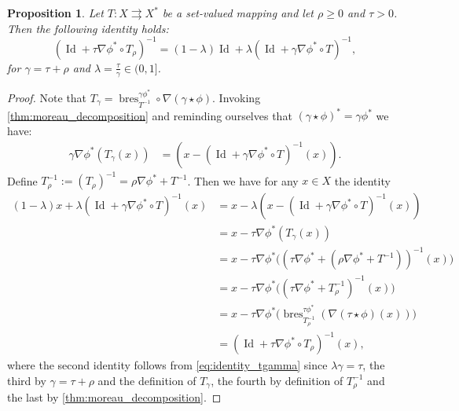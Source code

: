\documentclass[10pt,a4paper]{amsart}
\newtheorem{proposition}{Proposition}
\newcommand{\bres}[2]{\operatorname{bres}_{#2}^{#1}}
\DeclareMathOperator{\id}{Id}
\begin{document}
\begin{proposition} \label{thm:absorb_relaxation_stepsize}
    Let $T: X \rightrightarrows X^*$ be a set-valued mapping and let $\rho \geq 0$ and $\tau >0$. Then the following identity holds:
    \begin{equation}
    (\id + \tau \nabla \phi^* \circ T_\rho)^{-1} = (1 - \lambda) \id + \lambda(\id + \gamma\nabla \phi^* \circ T)^{-1},
    \end{equation}
    for $\gamma = \tau + \rho$ and $\lambda = \tfrac{\tau}{\gamma} \in (0, 1]$.
\end{proposition}

\begin{proof}
Note that $T_\gamma = \bres{\gamma\phi^*}{T^{-1}} \circ \nabla (\gamma \star\phi)$.
Invoking \cref{thm:moreau_decomposition} and reminding ourselves that $(\gamma \star \phi)^* = \gamma \phi^*$ we have:
\begin{align} \label{eq:identity_tgamma}
\gamma \nabla \phi^*(T_\gamma(x))&= (x - (\id + \gamma \nabla \phi^* \circ T)^{-1}(x)).
\end{align}
Define $T_\rho^{-1}:= (T_\rho)^{-1} = \rho \nabla \phi^* + T^{-1}$.
Then we have for any $x\in X$ the identity
\begin{align*}
(1 - \lambda) x + \lambda(\id + \gamma \nabla \phi^* \circ T)^{-1}(x) &= x - \lambda(x - (\id + \gamma \nabla \phi^* \circ T)^{-1}(x)) \\
&= x - \tau \nabla \phi^*(T_\gamma(x)) \\
&= x - \tau \nabla \phi^*\big((\tau \nabla \phi^* + (\rho \nabla \phi^* + T^{-1}))^{-1}(x)\big) \\
&= x - \tau \nabla \phi^*\big((\tau \nabla \phi^* + T_\rho^{-1})^{-1}(x)\big) \\
&= x - \tau \nabla \phi^*\big(\bres{\tau \phi^*}{T_\rho^{-1}}(\nabla (\tau \star \phi)(x))\big) \\
&=(\id + \tau \nabla \phi^* \circ T_\rho)^{-1}(x),
\end{align*}
where the second identity follows from \cref{eq:identity_tgamma} since $\lambda \gamma = \tau $, the third by $\gamma = \tau+\rho$ and the definition of $T_\gamma$, the fourth by definition of $T_\rho^{-1}$ and the last by \cref{thm:moreau_decomposition}.
\end{proof}
\end{document}
